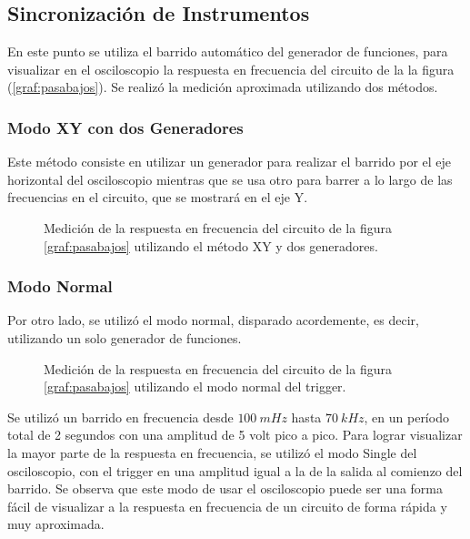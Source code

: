 \documentclass[a4paper]{article}
\begin{document}
\subsection*{Sincronización de Instrumentos}
En este punto se utiliza el barrido automático del generador de funciones, para visualizar en el osciloscopio la respuesta en frecuencia del circuito de la la figura (\ref{graf:pasabajos}). Se realizó la medición aproximada utilizando dos métodos.

\subsubsection*{Modo XY con dos Generadores}
Este método consiste en utilizar un generador para realizar el barrido por el eje horizontal del osciloscopio mientras que se usa otro para barrer a lo largo de las frecuencias en el circuito, que se mostrará en el eje Y.

\begin{figure}[H]
	\centering
	\caption{Medición de la respuesta en frecuencia del circuito de la figura \ref{graf:pasabajos} utilizando el método XY y dos generadores.} 
	\label{graf:osci_freq_alta}
\end{figure}

\subsubsection*{Modo Normal}
Por otro lado, se utilizó el modo normal, disparado acordemente, es decir, utilizando un solo generador de funciones.
\begin{figure}[H]
	\centering
	\caption{Medición de la respuesta en frecuencia del circuito de la figura \ref{graf:pasabajos} utilizando el modo normal del trigger.} 
	\label{graf:ej3modonormal}
\end{figure}
Se utilizó un barrido en frecuencia desde $100 \ mHz$ hasta $70 \ kHz$, en un período total de 2 segundos con una amplitud de 5 volt pico a pico. Para lograr visualizar la mayor parte de la respuesta en frecuencia, se utilizó el modo Single del osciloscopio, con el trigger en una amplitud igual a la de la salida al comienzo del barrido. Se observa que este modo de usar el osciloscopio puede ser una forma fácil de visualizar a la respuesta en frecuencia de un circuito de forma rápida y muy aproximada.
\end{document}
